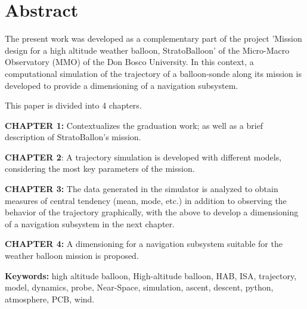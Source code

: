 \chapter*{Abstract}

The present work was developed as a complementary part of the project 'Mission design for a high altitude weather balloon, StratoBalloon' of the Micro-Macro Observatory (MMO) of the Don Bosco University. In this context, a computational simulation of the trajectory of a balloon-sonde along its mission is developed to provide a dimensioning of a navigation subsystem.

\vspace{0.5cm}

This paper is divided into 4 chapters.

\textbf{CHAPTER 1: }Contextualizes the graduation work; as well as a brief description of StratoBallon's mission.

\textbf{CHAPTER 2}: A trajectory simulation is developed with different models, considering the most key parameters of the mission. 

\textbf{CHAPTER 3:} The data generated in the simulator is analyzed to obtain measures of central tendency (mean, mode, etc.) in addition to observing the behavior of the trajectory graphically, with the above to develop a dimensioning of a navigation subsystem in the next chapter.

\textbf{CHAPTER 4: }A dimensioning for a navigation subsystem suitable for the weather balloon mission is proposed.

\vspace{1.5cm}

\textbf{Keywords:} high altitude balloon, High-altitude balloon, HAB, ISA, trajectory, model, dynamics, probe, Near-Space, simulation, ascent, descent, python, atmosphere, PCB, wind.